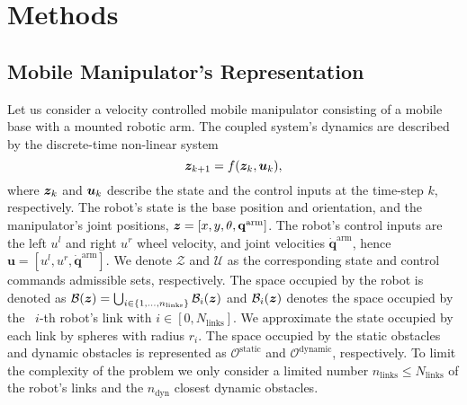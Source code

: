 \section{Methods}%
\label{sec:icra21_methods}

\subsection{Mobile Manipulator's Representation}

Let us consider a velocity controlled mobile manipulator consisting of a mobile base with a mounted robotic arm. The coupled system's dynamics are described by the discrete-time non-linear system
\begin{equation}
  \bm{z}_{k+1} = f(\bm{z}_k, \bm{u}_k), 
\end{equation}
where $\bm{z}_k$ and $\bm{u}_k$ describe the state and the control inputs at the time-step $k$, respectively. The robot's state is the base position and orientation, and the manipulator's joint positions, $\bm{z} = [x,y,\theta,\mathbf{q}^{\textrm{arm}}]$. The robot's control inputs are the left $u^l$ and right $u^r$ wheel velocity, and joint velocities $\dot{\mathbf{q}}^{\textrm{arm}}$, hence $\mathbf{u}=[u^l,u^r,\dot{\mathbf{q}}^{\textrm{arm}}]$.  We denote $\mathcal{Z}$ and $\mathcal{U}$ as the corresponding state and control commands admissible sets, respectively.
The space occupied by the robot is denoted as $\mathcal{B}(\bm{z})=\bigcup_{i \in \{1,\dots,n_{\textrm{links}} \}}\mathcal{B}_i(\bm{z})$ and $\mathcal{B}_i(\bm{z})$ denotes the space occupied by the ~{$i$-th} robot's link with $i\in[0,N_{\textrm{links}}]$. We approximate the state occupied by each link by spheres with radius $r_i$. The space occupied by the static obstacles and dynamic obstacles is represented as $\mathcal{O}^{\textrm{static}}$ and $\mathcal{O}^{\textrm{dynamic}}$, respectively. To limit the complexity of the problem we only consider a limited number $n_{\textrm{links}} \le N_{\textrm{links}}$ of the robot's links and the $n_{\textrm{dyn}} $ closest dynamic obstacles.


